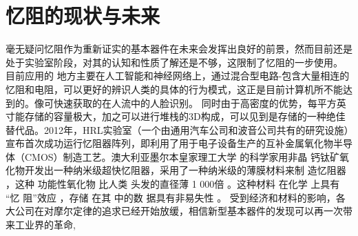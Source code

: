 \documentclass[UTF8]{article}
\begin{document}
\section{忆阻的现状与未来}
毫无疑问忆阻作为重新证实的基本器件在未来会发挥出良好的前景，然而目前还是处于实验室阶段，对其的认知和性质了解还是不够，这限制了忆阻的一步使用。
目前应用的 地方主要在人工智能和神经网络上\cite{mem2009}，通过混合型电路-包含大量相连的忆阻和电阻，可以更好的辨识人类的具体的行为模式，这正是目前计算机所不能达到的。像可快速获取的在人流中的人脸识别。
同时由于高密度的优势，每平方英寸能存储的容量极大，加之可以进行堆栈的3D构成，可以见到是存储的一种绝佳替代品\cite{mem2012}。2012年，HRL实验室（一个由通用汽车公司和波音公司共有的研究设施）宣布首次成功运行忆阻器阵列\cite{mem2010}，即利用了用于电子设备生产的互补金属氧化物半导体（CMOS）制造工艺。澳大利亚墨尔本皇家理工大学 的科学家用非晶 钙钛矿氧化物开发出一种纳米级超快忆阻器\cite{ou}，采用了一种纳米级的薄膜材料来制 造忆阻器 ，这种 功能性氧化物 比人类 头发的直径薄 1 000倍 。这种材料 在化学 上具有 “忆 阻”效应 ，存储 在其 中的数 据具有非易失性 。 受到经济和材料的影响，各大公司在对摩尔定律的追求已经开始放缓，相信新型基本器件的发现可以再一次带来工业界的革命\cite{moore1},




\end{document}
